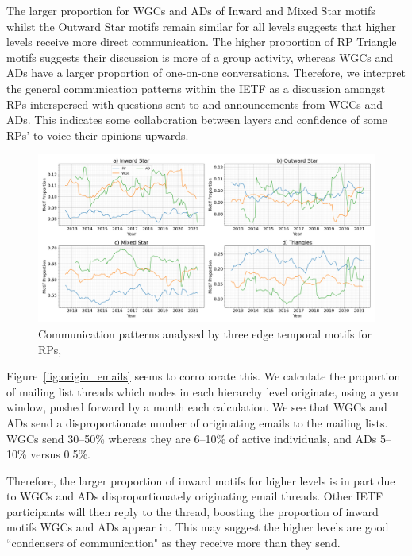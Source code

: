 \documentclass[twocolumn,10pt]{article}
\newlength{\figureWidthTwoColumn}
\begin{document}
The larger proportion for WGCs and ADs of Inward and Mixed Star motifs
whilst the Outward Star motifs remain similar for all levels suggests that
higher levels receive more direct communication. The higher proportion of
RP Triangle motifs suggests their discussion is more of a group activity,
whereas WGCs and ADs have a larger proportion of one-on-one conversations.
Therefore, we interpret the general communication patterns within the IETF
as a discussion amongst RPs interspersed with questions sent to and
announcements from WGCs and ADs. This indicates some collaboration between
layers and confidence of some RPs' to voice their opinions upwards.

\begin{figure}[t]
  \centering
  \includegraphics[width=\figureWidthTwoColumn]{figures-prev/icwsm-2024/motif_strata_comparison.png}
  \caption{
    Communication patterns analysed by three edge temporal motifs for RPs,
  }
  \label{fig:motif_proportions}
\end{figure}


Figure~\ref{fig:origin_emails} seems to corroborate this. We calculate the
proportion of mailing list threads which nodes in each hierarchy level
originate, using a year window, pushed forward by a month each calculation.
We see that WGCs and ADs send a disproportionate number of originating
emails to the mailing lists. WGCs send 30--50\% whereas they are 6--10\% of
active individuals, and ADs 5--10\% versus 0.5\%. 

Therefore, the larger proportion of inward motifs for higher levels is in
part due to WGCs and ADs disproportionately originating email threads.
Other IETF participants will then reply to the thread, boosting the
proportion of inward motifs WGCs and ADs appear in. This may suggest the
higher levels are good ``condensers of communication" as they receive more
than they send.
\end{document}
